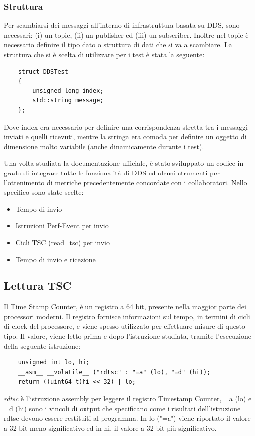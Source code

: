 \subsubsection*{Struttura}

Per scambiarsi dei messaggi all'interno di infrastruttura basata su DDS, sono necessari: (i) un topic, (ii) un publisher ed (iii) un subscriber. Inoltre nel topic è necessario definire il tipo dato o struttura di dati che si va a scambiare. La struttura che si è scelta di utilizzare per i test è stata la seguente:
\begin{verbatim}
    struct DDSTest
    {
        unsigned long index;
        std::string message;
    };
\end{verbatim}
Dove index era necessario per definire una corrispondenza stretta tra i messaggi inviati e quelli ricevuti, mentre la stringa era comoda per definire un oggetto di dimensione molto variabile (anche dinamicamente durante i test).

Una volta studiata la documentazione ufficiale, è stato sviluppato un codice in grado di integrare tutte le funzionalità di DDS ed alcuni strumenti per l'ottenimento di metriche precedentemente concordate con i collaboratori. Nello specifico sono state scelte:
\begin{itemize}
    \item Tempo di invio
    \item Istruzioni Perf-Event per invio
    \item Cicli TSC (read\_tsc) per invio
    \item Tempo di invio e ricezione
\end{itemize}
\subsection{Lettura TSC}
Il Time Stamp Counter, è un registro a 64 bit, presente nella maggior parte dei processori moderni. Il registro fornisce informazioni sul tempo, in termini di cicli di clock del processore, e viene spesso utilizzato per effettuare misure di questo tipo. Il valore, viene letto prima e dopo l'istruzione studiata, tramite l'esecuzione della seguente istruzione:
\begin{verbatim}
    unsigned int lo, hi;
    __asm__ __volatile__ ("rdtsc" : "=a" (lo), "=d" (hi));
    return ((uint64_t)hi << 32) | lo; 
\end{verbatim}
\emph{rdtsc} è l'istruzione assembly per leggere il registro Timestamp Counter, =a (lo) e =d (hi) sono i vincoli di output che specificano come i risultati dell'istruzione rdtsc devono essere restituiti al programma. In lo ("=a") viene riportato il valore a 32 bit meno significativo ed in hi, il valore a 32 bit più significativo.

